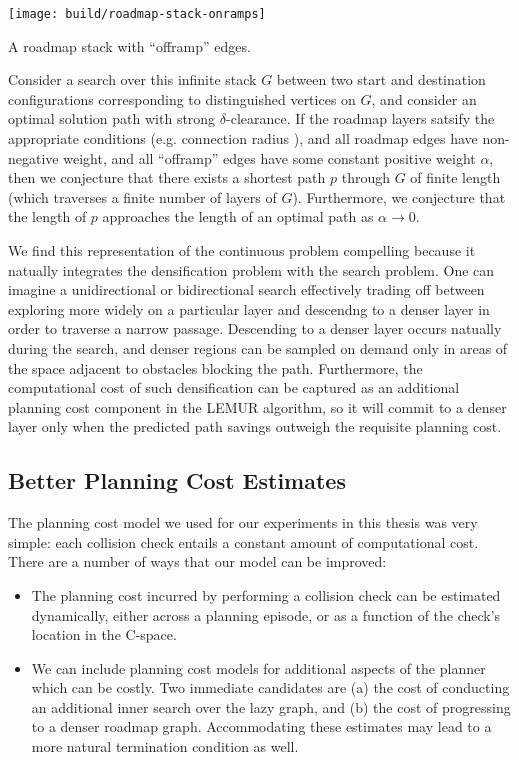 
\begin{marginfigure}
   \centering
   \texttt{[image: build/roadmap-stack-onramps]}
   \caption{A roadmap stack with ``offramp'' edges.}
   \label{fig:discussion:roadmap-stack-onramps}
\end{marginfigure}

Consider a search over this infinite stack $G$
between two start and destination
configurations corresponding to distinguished vertices on $G$,
and consider an optimal solution path with strong $\delta$-clearance.
If the roadmap layers satsify the appropriate conditions
(e.g. connection radius
\citep{karaman2011samplingoptimal, janson2015deterministicsampling}),
and all roadmap edges have non-negative weight,
and all ``offramp'' edges have some constant positive weight $\alpha$,
then we conjecture that there exists a shortest path $p$ through $G$
of finite length (which traverses a finite number of layers of $G$).
Furthermore,
we conjecture that the length of $p$ approaches the length of an
optimal path as $\alpha \rightarrow 0$.

We find this representation of the continuous problem compelling
because it natually integrates the densification problem with
the search problem.
One can imagine a unidirectional or bidirectional search
effectively trading off between
exploring more widely on a particular layer
and descendng to a denser layer in order to traverse a narrow passage.
Descending to a denser layer occurs natually during the search,
and denser regions can be sampled on demand only in areas of the space
adjacent to obstacles blocking the path.
Furthermore,
the computational cost of such densification can be captured as
an additional planning cost component in the LEMUR algorithm,
so it will commit to a denser layer only when the predicted path
savings outweigh the requisite planning cost.

\subsection{Better Planning Cost Estimates}

The planning cost model we used for our experiments in this thesis
was very simple:
each collision check entails a constant amount of computational cost.
There are a number of ways that our model can be improved:
\begin{itemize}
\item The planning cost incurred by performing a collision check
   can be estimated dynamically,
   either across a planning episode,
   or as a function of the check's location in the C-space.
\item We can include planning cost models for additional aspects of
   the planner which can be costly.
   Two immediate candidates are
   (a) the cost of conducting an additional inner search
   over the lazy graph,
   and (b) the cost of progressing to a denser roadmap graph.
   Accommodating these estimates may lead to a more natural
   termination condition as well.
\end{itemize}


